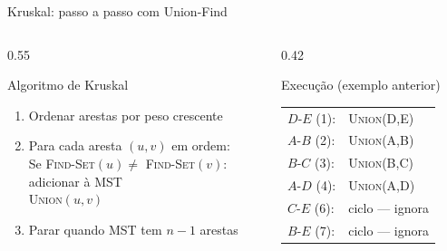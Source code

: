 \documentclass[aspectratio=169]{beamer}
\begin{document}
\begin{frame}{Kruskal: passo a passo com Union-Find}%
  \begin{columns}[T]
    \begin{column}{0.55\textwidth}
      \begin{block}{Algoritmo de Kruskal}
        \begin{enumerate}
          \item Ordenar arestas por peso crescente
          \item Para cada aresta $(u,v)$ em ordem:\\
            \quad Se \textsc{Find-Set}$(u) \neq$ \textsc{Find-Set}$(v)$:\\
            \quad\quad adicionar à MST\\
            \quad\quad \textsc{Union}$(u,v)$
          \item Parar quando MST tem $n-1$ arestas
        \end{enumerate}
      \end{block}
    \end{column}
    \begin{column}{0.42\textwidth}
      \begin{exampleblock}{Execução (exemplo anterior)}
        \begin{tabular}{ll}
          $D$-$E$ (1): & \textsc{Union}(D,E) \\
          $A$-$B$ (2): & \textsc{Union}(A,B) \\
          $B$-$C$ (3): & \textsc{Union}(B,C) \\
          $A$-$D$ (4): & \textsc{Union}(A,D) \\
          $C$-$E$ (6): & ciclo — ignora \\
          $B$-$E$ (7): & ciclo — ignora \\
        \end{tabular}
      \end{exampleblock}
    \end{column}
  \end{columns}
\end{frame}
\end{document}
